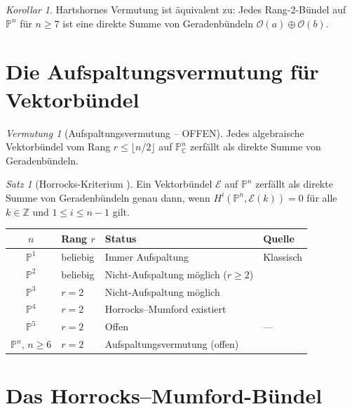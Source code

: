 \documentclass[12pt,a4paper]{amsart}
\theoremstyle{definition}
\theoremstyle{remark}
\newtheorem{satz}[theorem]{Satz}
\newtheorem{korollar}[theorem]{Korollar}
\newtheorem{vermutung}[theorem]{Vermutung}
\newcommand{\PP}{\mathbb{P}}
\newcommand{\ZZ}{\mathbb{Z}}
\newcommand{\CC}{\mathbb{C}}
\newcommand{\OO}{\mathcal{O}}
\begin{document}
\begin{korollar}
Hartshornes Vermutung ist äquivalent zu: Jedes Rang-2-Bündel auf $\PP^n$
für $n \ge 7$ ist eine direkte Summe von Geradenbündeln $\OO(a) \oplus \OO(b)$.
\end{korollar}

\section{Die Aufspaltungsvermutung für Vektorbündel}

\begin{vermutung}[Aufspaltungsvermutung -- OFFEN]
\label{verm:aufspaltung}
Jedes algebraische Vektorbündel vom Rang $r \le \lfloor n/2 \rfloor$
auf $\PP^n_\CC$ zerfällt als direkte Summe von Geradenbündeln.
\end{vermutung}

\begin{satz}[Horrocks-Kriterium \cite{Horrocks1964}]
Ein Vektorbündel $\mathcal{E}$ auf $\PP^n$ zerfällt als direkte Summe von
Geradenbündeln genau dann, wenn $H^i(\PP^n, \mathcal{E}(k)) = 0$ für alle
$k \in \ZZ$ und $1 \le i \le n-1$ gilt.
\end{satz}

\begin{center}
\begin{tabular}{clll}
\toprule
$n$ & Rang $r$ & Status & Quelle \\
\midrule
$\PP^1$ & beliebig & Immer Aufspaltung & Klassisch \\
$\PP^2$ & beliebig & Nicht-Aufspaltung möglich ($r \ge 2$) & \\
$\PP^3$ & $r=2$ & Nicht-Aufspaltung möglich & \\
$\PP^4$ & $r=2$ & Horrocks--Mumford existiert & \cite{HorrocksMumford1973} \\
$\PP^5$ & $r=2$ & Offen & --- \\
$\PP^n$, $n \ge 6$ & $r=2$ & Aufspaltungsvermutung (offen) & \cite{Hartshorne1974} \\
\bottomrule
\end{tabular}
\end{center}

\section{Das Horrocks--Mumford-Bündel}
\end{document}
